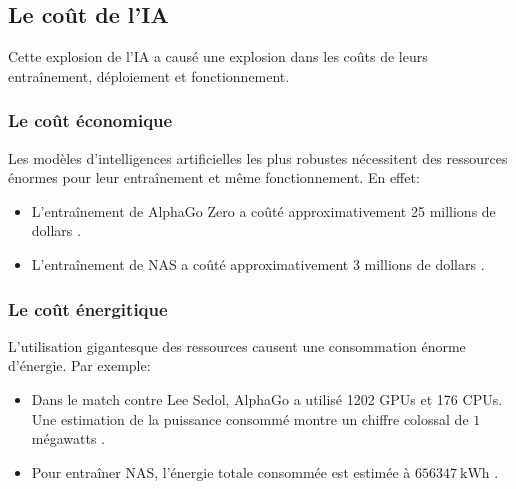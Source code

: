 \subsection{Le coût de l'IA}
Cette explosion de l'IA a causé une explosion dans les coûts de leurs entraînement, déploiement et fonctionnement.


\subsubsection{Le coût économique}
Les modèles d'intelligences artificielles les plus robustes nécessitent des ressources énormes pour leur entraînement et même fonctionnement.
\newline En effet: 
\begin{itemize}
	\item L'entraînement de AlphaGo Zero a coûté approximativement 25 millions de dollars \cite{AlphaGoZeroCost}.
	\item L'entraînement de NAS a coûté approximativement 3 millions de dollars \cite{ShrinkingDeepLearningCarbon}.
\end{itemize}
\subsubsection{Le coût énergitique}
L'utilisation gigantesque des ressources causent une consommation énorme d'énergie.
\newline Par exemple:
\begin{itemize}
	\item Dans le match contre Lee Sedol, AlphaGo a utilisé 1202 GPUs et 176 CPUs. Une estimation de la puissance consommé montre un chiffre colossal de $1$ mégawatts \cite{ShrinkingDeepLearningCarbon}.
	\item Pour entraîner NAS, l'énergie totale consommée est estimée à $656347 \ \text{kWh}$ \cite{CO2Footprint}.
\end{itemize}

